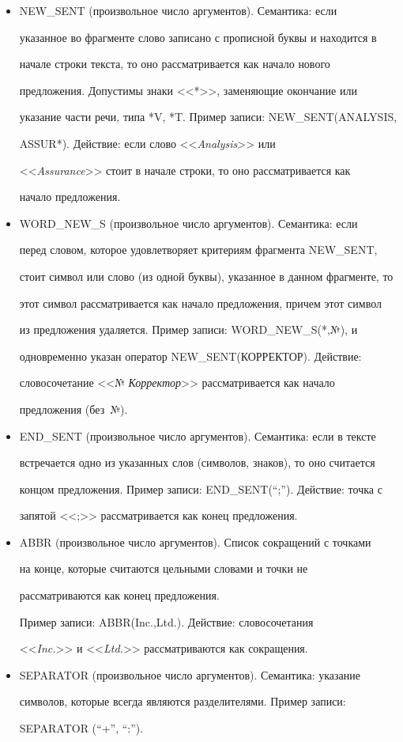    \begin{itemize} %


   \item NEW\_SENT (произвольное число аргументов). Семантика: если 


указанное во фрагменте слово записано с прописной буквы и находится в 


начале строки текста, то оно рассматривается как начало нового 


предложения. Допустимы знаки <<*>>, заменяющие окончание или 


указание части речи, типа *V, *T. Пример записи: NEW\_SENT(ANALYSIS, 


ASSUR*). Действие: если слово <<\textit{Analysis}>> или 


<<\textit{Assurance}>> стоит в начале строки, то оно рассматривается как 


начало предложения.


   \item WORD\_NEW\_S (произвольное число аргументов). Семантика: если 


перед словом, которое удовлетворяет критериям фрагмента NEW\_SENT,


стоит символ или слово (из одной буквы), указанное в данном фрагменте, то 


этот символ рассматривается как начало предложения, причем этот символ 


из предложения удаляется. Пример записи: WORD\_NEW\_S(*,№), и 


одновременно указан оператор NEW\_SENT(КОРРЕКТОР). Действие: 


словосочетание <<№ \textit{Корректор}>> рассматривается как начало 


предложения (без~№).


   \item END\_SENT (произвольное число аргументов). Семантика: если в тексте 


встречается одно из указанных слов (символов, знаков), то оно считается 


концом предложения. Пример записи: END\_SENT(``;''). Действие: точка с 


запятой <<;>> рассматривается как конец предложения.


   \item ABBR (произвольное  число аргументов). Список сокращений с точками 


на конце, которые считаются цельными словами и точки не 


рассматриваются как конец предложения.


   


   Пример записи: ABBR(Inc.,Ltd.). Действие: словосочетания 


<<\textit{Inc.}>> и <<\textit{Ltd.}>> рассматриваются как сокращения. 


   \item SEPARATOR (произвольное  число аргументов). Семантика: указание 


символов, которые всегда являются разделителями. Пример записи:  


SEPARATOR (``+'', ``:'').


   \end{itemize}
